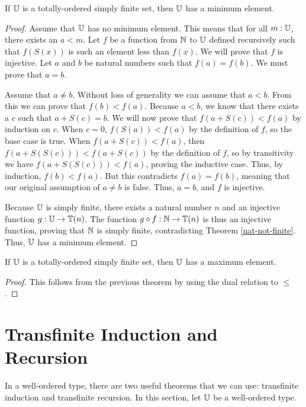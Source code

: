 \documentclass[../math.tex]{subfiles}
\begin{document}
\begin{theorem} \label{simple-finite-min}
    If $\mathbb{U}$ is a totally-ordered simply finite set, then $\mathbb{U}$ has a minimum
    element.
\end{theorem}
\begin{proof}
    Assume that $\mathbb{U}$ has no minimum element.  This means that for all $m : \mathbb{U}$,
    there exists an $a < m$.  Let $f$ be a function from $\mathbb{N}$ to $\mathbb{U}$ defined
    recursively such that $f(S(x))$ is such an element less than $f(x)$.  We
    will prove that $f$ is injective.  Let $a$ and $b$ be natural numbers such
    that $f(a) = f(b)$.  We must prove that $a = b$.

    Assume that $a \neq b$.  Without loss of generality we can assume that $a <
    b$.  From this we can prove that $f(b) < f(a)$.  Because $a < b$, we know
    that there exists a $c$ such that $a + S(c) = b$.  We will now prove that
    $f(a + S(c)) < f(a)$ by induction on $c$.  When $c = 0$, $f(S(a)) < f(a)$ by
    the definition of $f$, so the base case is true.  When $f(a + S(c)) < f(a)$,
    then $f(a + S(S(c))) < f(a + S(c))$ by the definition of $f$, so by
    transitivity we have $f(a + S(S(c))) < f(a)$, proving the inductive case.
    Thus, by induction, $f(b) < f(a)$.  But this contradicts $f(a) = f(b)$,
    meaning that our original assumption of $a \neq b$ is false.  Thus, $a = b$,
    and $f$ is injective.

    Because $\mathbb{U}$ is simply finite, there exists a natural number $n$ and an
    injective function $g : \mathbb{U} \to \mathbb{T}(n)$.  The function $g \circ f : \mathbb{N} \to
    \mathbb{T}(n)$ is thus an injective function, proving that $\mathbb{N}$ is simply finite,
    contradicting Theorem \ref{nat-not-finite}.  Thus, $\mathbb{U}$ has a minimum
    element.
\end{proof}

\begin{theorem} \label{simple-finite-max}
    If $\mathbb{U}$ is a totally-ordered simply finite set, then $\mathbb{U}$ has a maximum
    element.
\end{theorem}
\begin{proof}
    This follows from the previous theorem by using the dual relation to $\leq$.
\end{proof}

\section{Transfinite Induction and Recursion}

In a well-ordered type, there are two useful theorems that we can use:
transfinite induction and transfinite recursion.  In this section, let $\mathbb{U}$ be a
well-ordered type.
\end{document}
